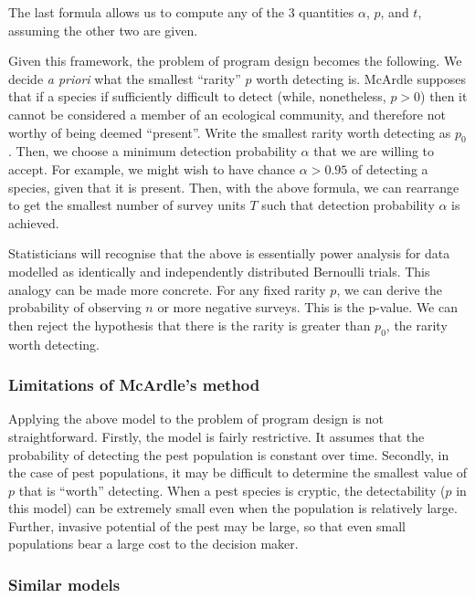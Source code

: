 \documentclass[
]{book}
\begin{document}
The last formula allows us to compute any of the 3 quantities \(\alpha\), \(p\), and \(t\), assuming the other two are given.

Given this framework, the problem of program design becomes the following. We decide \emph{a priori} what the smallest ``rarity'' \(p\) worth detecting is. McArdle supposes that if a species if sufficiently difficult to detect (while, nonetheless, \(p > 0\)) then it cannot be considered a member of an ecological community, and therefore not worthy of being deemed ``present''. Write the smallest rarity worth detecting as \(p_0\). Then, we choose a minimum detection probability \(\alpha\) that we are willing to accept. For example, we might wish to have chance \(\alpha > 0.95\) of detecting a species, given that it is present. Then, with the above formula, we can rearrange to get the smallest number of survey units \(T\) such that detection probability \(\alpha\) is achieved.

Statisticians will recognise that the above is essentially power analysis for data modelled as identically and independently distributed Bernoulli trials. This analogy can be made more concrete. For any fixed rarity \(p\), we can derive the probability of observing \(n\) or more negative surveys. This is the p-value. We can then reject the hypothesis that there is the rarity is greater than \(p_0\), the rarity worth detecting.

\hypertarget{limitations-of-mcardles-method}{%
\subsubsection{Limitations of McArdle's method}\label{limitations-of-mcardles-method}}

Applying the above model to the problem of program design is not straightforward. Firstly, the model is fairly restrictive. It assumes that the probability of detecting the pest population is constant over time. Secondly, in the case of pest populations, it may be difficult to determine the smallest value of \(p\) that is ``worth'' detecting. When a pest species is cryptic, the detectability (\(p\) in this model) can be extremely small even when the population is relatively large. Further, invasive potential of the pest may be large, so that even small populations bear a large cost to the decision maker.

\hypertarget{similar-models}{%
\subsubsection{Similar models}\label{similar-models}}
\end{document}
